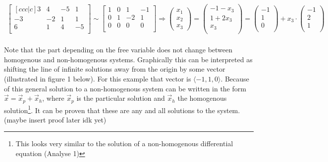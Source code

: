 \documentclass[11pt, a4paper]{article}
\begin{document}
\begin{align*}
  \begin{bmatrix}[ccc|c]
    3 & 4 & -5 & 1\\
    -3 & -2 & 1 & 1\\
    6 & 1 & 4 & -5\\
  \end{bmatrix}
  \sim
  \begin{bmatrix}
    1 & 0 & 1 & -1\\
    0 & 1 & -2 & 1\\
    0 & 0 & 0 & 0\\
  \end{bmatrix}
  \Rightarrow
  \begin{pmatrix} x_1 \\ x_2 \\ x_3 \end{pmatrix}
  = \begin{pmatrix} -1 - x_3\\ 1 + 2x_3\\ x_3\\ \end{pmatrix}
  = \begin{pmatrix} -1\\ 1\\ 0\\ \end{pmatrix} + x_3 \cdot \begin{pmatrix} -1\\ 2\\ 1\\ \end{pmatrix}
\end{align*}
\\
Note that the part depending on the free variable does not change between homogenous 
and non-homogenous systems. Graphically this can be interpreted as shifting the line of 
infinite solutions away  from the origin by some vector (illustrated in figure 1 below). For this example that vector is 
$\langle -1, 1, 0 \rangle$. Because of this general solution to a non-homogenous system can
be written in the form  $\vec{x} = \vec{x}_p + \vec{x}_h$, where $\vec{x}_p$ is the particular
solution and $\vec{x}_h$ the homogenous solution\footnote{This looks very similar to the solution of a 
non-homogenous differential equation (Analyse 1)}. 
It can be proven that these are any and all solutions to the system. (maybe insert proof later idk yet)
\end{document}
